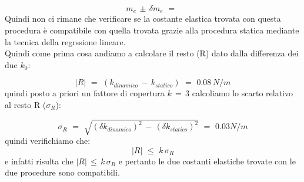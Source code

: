 \begin{equation*}
	m_e \, \pm \, \delta m_e \,\,=\,\, 
\end{equation*}
%
Quindi non ci rimane che verificare se la costante elastica trovata con questa procedura è compatibile con quella trovata grazie alla procedura statica mediante la tecnica della regrssione lineare.\\
Quindi come prima cosa andiamo a calcolare il resto (R) dato dalla differenza dei due $k_0$:

\begin{equation*}
	|R| \,\,=\,\, (k_{dinamico} \,-\, k_{statico}) \,\,=\,\, 0.08 \, N/m
\end{equation*}
%
quindi posto a priori un fattore di copertura $k \,=\, 3$ calcoliamo lo scarto relativo al resto R ($\sigma_R$):

\begin{equation*}
	\sigma_R \,\,=\,\, \sqrt{(\delta k_{dinamico})^2 \,-\, (\delta k_{statico})^2} \,\,=\,\, 0.03 N/m	
\end{equation*}
%
quindi verifichiamo che:
\begin{equation*}
	|R| \,\,\leq\,\, k \, \sigma_R  
\end{equation*}
%
e infatti risulta che $|R| \,\leq\, k\,\sigma_R$ e pertanto le due costanti elastiche trovate con le due procedure sono compatibili.



